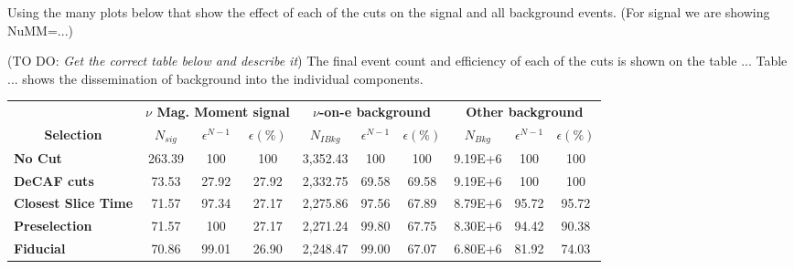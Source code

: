 \documentclass[12pt]{article}
\newcommand{\todo }[1]{({\color{red}\sc TO DO: \textit{#1}})}
\begin{document}
Using the many plots below that show the effect of each of the cuts on the signal and all background events. (For signal we are showing NuMM=...)

\todo{Get the correct table below and describe it}
The final event count and efficiency of each of the cuts is shown on the table ... Table ... shows the dissemination of background into the individual components.

\begin{table}[!hb]
\begin{tabular}{|l|ccc|ccc|ccc|}\hline
\multicolumn{1}{|c|}{}                                     & \multicolumn{3}{c|}{\textbf{$\nu$ Mag. Moment signal}}          & \multicolumn{3}{c|}{\textbf{$\nu$-on-e background}}                      & \multicolumn{3}{c|}{\textbf{Other background}}                           \\
\multicolumn{1}{|c|}{\multirow{-2}{*}{\textbf{Selection}}} & \multicolumn{1}{c}{\textbf{$N_{sig}$}} & \textbf{$\epsilon^{N-1}$} & \textbf{$\epsilon \left(\%\right)$} & \multicolumn{1}{c}{\textbf{$N_{IBkg}$}} & \textbf{$\epsilon^{N-1}$} & \textbf{$\epsilon \left(\%\right)$} & \multicolumn{1}{c}{\textbf{$N_{Bkg}$}} & \textbf{$\epsilon^{N-1}$} & \textbf{$\epsilon \left(\%\right)$} \\\hline
\textbf{No Cut}                                          & 263.39                                 & 100       & 100       & 3,352.43                                         & 100       & 100       & 9.19E+6                                         & 100       & 100       \\
\textbf{DeCAF cuts}                                      & 73.53                                  & 27.92     & 27.92     & 2,332.75                                         & 69.58     & 69.58     & 9.19E+6 & 100       & 100       \\
\textbf{Closest Slice Time}                              & 71.57                                  & 97.34     & 27.17     & 2,275.86                                         & 97.56     & 67.89     & 8.79E+6                                         & 95.72     & 95.72     \\
\textbf{Preselection}                                    & 71.57                                  & 100       & 27.17     & 2,271.24                                         & 99.80     & 67.75     & 8.30E+6                                         & 94.42     & 90.38     \\
\textbf{Fiducial}                                        & 70.86                                  & 99.01     & 26.90     & 2,248.47                                         & 99.00     & 67.07     & 6.80E+6                                         & 81.92     & 74.03     \\

\end{tabular}
\end{table}
\end{document}
